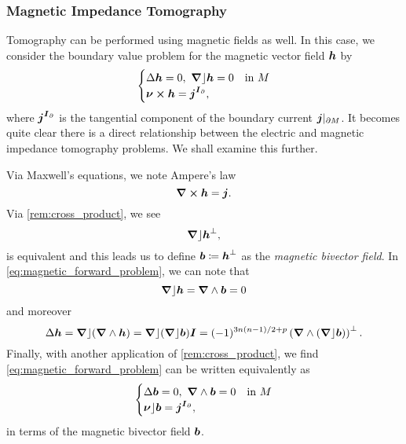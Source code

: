 \subsubsection{Magnetic Impedance Tomography}

Tomography can be performed using magnetic fields as well. In this case, we consider the boundary value problem for the magnetic vector field $\boldsymbol{h}$ by
\begin{equation}
\label{eq:magnetic_forward_problem}
\begin{cases}
\Delta \boldsymbol{h} = 0, ~\boldsymbol{\nabla} \rfloor \boldsymbol{h}=0 & \textrm{in $M$}\\
\boldsymbol{\nu}\boldsymbol{\times} \boldsymbol{h} = \boldsymbol{j}^{\boldsymbol{I}_\partial},
\end{cases}
\end{equation}
where $\boldsymbol{j}^{\boldsymbol{I}_\partial}$ is the tangential component of the boundary current $\boldsymbol{j}\vert_{{\partial M}}$. It becomes quite clear there is a direct relationship between the electric and magnetic impedance tomography problems. We shall examine this further.

Via Maxwell's equations, we note Ampere's law
\begin{equation}
\boldsymbol{\nabla} \boldsymbol{\times} \boldsymbol{h} = \boldsymbol{j}.
\end{equation}
Via \cref{rem:cross_product}, we see
\begin{equation}
\boldsymbol{\nabla} \rfloor \boldsymbol{h}^\perp,
\end{equation}
is equivalent and this leads us to define $\boldsymbol{b}\coloneqq \boldsymbol{h}^\perp$ as the \emph{magnetic bivector field}. In \cref{eq:magnetic_forward_problem}, we can note that
\begin{equation}
\boldsymbol{\nabla} \rfloor \boldsymbol{h} = \boldsymbol{\nabla} \wedge \boldsymbol{b} = 0
\end{equation}
and moreover
\begin{equation}
\Delta \boldsymbol{h} = \boldsymbol{\nabla} \rfloor (\boldsymbol{\nabla} \wedge \boldsymbol{h}) = \boldsymbol{\nabla} \rfloor (\boldsymbol{\nabla} \rfloor \boldsymbol{b})\boldsymbol{I} = (-1)^{3n(n-1)/2+p} \left(\boldsymbol{\nabla} \wedge (\boldsymbol{\nabla} \rfloor \boldsymbol{b})\right)^\perp.
\end{equation}
Finally, with another application of \cref{rem:cross_product}, we find \cref{eq:magnetic_forward_problem} can be written equivalently as
\begin{equation}
\begin{cases}
\Delta \boldsymbol{b} = 0, ~\boldsymbol{\nabla} \wedge \boldsymbol{b}=0 & \textrm{in $M$}\\
\boldsymbol{\nu}\rfloor \boldsymbol{b} = \boldsymbol{j}^{\boldsymbol{I}_\partial},
\end{cases}
\end{equation}
in terms of the magnetic bivector field $\boldsymbol{b}$.


